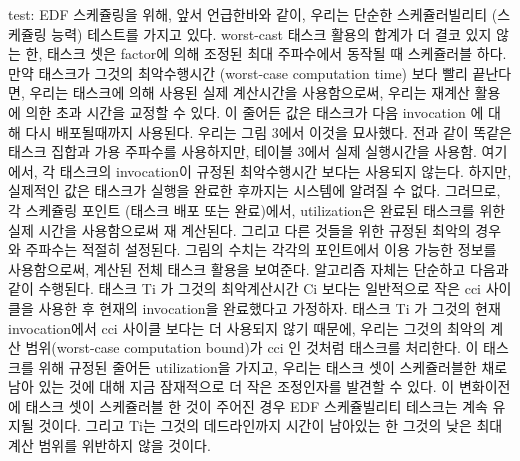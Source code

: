 \documentclass[11pt
  , a4paper
  , article
  , oneside
]{memoir}
\begin{document}
test:
EDF 스케쥴링을 위해, 앞서 언급한바와 같이, 우리는 단순한 스케쥴러빌리티 (스케쥴링 능력) 테스트를 가지고 있다. worst-cast 태스크 활용의 합계가 더 결코 있지 않는 한, 태스크 셋은 factor에 의해 조정된 최대 주파수에서 동작될 때 스케쥴러블 하다. 만약 태스크가 그것의 최악수행시간 (worst-case computation time) 보다 빨리 끝난다면, 우리는 태스크에 의해 사용된 실제 계산시간을 사용함으로써, 우리는 재계산 활용에 의한 초과 시간을 교정할 수 있다. 
이 줄어든 값은 태스크가 다음 invocation 에 대해 다시 배포될때까지 사용된다. 
우리는 그림 3에서 이것을 묘사했다. 전과 같이 똑같은 태스크 집합과 가용 주파수를 사용하지만, 테이블 3에서 실제 실행시간을 사용함. 여기에서, 각 태스크의 invocation이 규정된 최악수행시간 보다는 사용되지 않는다. 하지만, 실제적인 값은 태스크가 실행을 완료한 후까지는 시스템에 알려질 수 없다. 
그러므로, 각 스케쥴링 포인트 (태스크 배포 또는 완료)에서, utilization은 완료된 태스크를 위한 실제 시간을 사용함으로써 재 계산된다. 그리고 다른 것들을 위한 규정된 최악의 경우와 주파수는 적절히 설정된다. 
그림의 수치는 각각의 포인트에서 이용 가능한 정보를 사용함으로써, 계산된 전체 태스크 활용을 보여준다. 알고리즘 자체는 단순하고 다음과 같이 수행된다. 
태스크 Ti 가 그것의 최악계산시간 Ci 보다는 일반적으로 작은 cci 사이클을 사용한 후 현재의 invocation을 완료했다고 가정하자. 태스크 Ti 가 그것의 현재 invocation에서 cci 사이클 보다는 더 사용되지 않기 때문에, 우리는 그것의 최악의 계산 범위(worst-case computation bound)가 cci 인 것처럼 태스크를 처리한다. 이 태스크를 위해 규정된 줄어든 utilization을 가지고, 우리는 태스크 셋이 스케쥴러블한 채로 남아 있는 것에 대해 지금 잠재적으로 더 작은 조정인자를 발견할 수 있다. 이 변화이전에 태스크 셋이 스케쥴러블 한 것이 주어진 경우 EDF 스케쥴빌리티 테스크는 계속 유지될 것이다. 그리고 Ti는 그것의 데드라인까지 시간이 남아있는 한 그것의 낮은 최대 계산 범위를 위반하지 않을 것이다.
\end{document}
